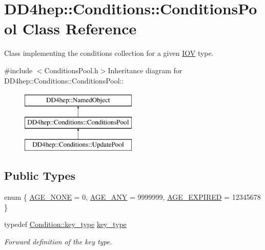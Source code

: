 \hypertarget{class_d_d4hep_1_1_conditions_1_1_conditions_pool}{
\section{DD4hep::Conditions::ConditionsPool Class Reference}
\label{class_d_d4hep_1_1_conditions_1_1_conditions_pool}
}


Class implementing the conditions collection for a given \hyperlink{class_d_d4hep_1_1_i_o_v}{IOV} type.  


{\ttfamily \#include $<$ConditionsPool.h$>$}Inheritance diagram for DD4hep::Conditions::ConditionsPool::\begin{figure}[H]
\begin{center}
\leavevmode
\includegraphics[height=3cm]{class_d_d4hep_1_1_conditions_1_1_conditions_pool}
\end{center}
\end{figure}
\subsection*{Public Types}
\begin{DoxyCompactItemize}
\item 
enum \{ \hyperlink{class_d_d4hep_1_1_conditions_1_1_conditions_pool_a3f11aa918cf5bb4fdc5958cfee1db0d6a2f31419779b9f1077b365a1619b33157}{AGE\_\-NONE} =  0, 
\hyperlink{class_d_d4hep_1_1_conditions_1_1_conditions_pool_a3f11aa918cf5bb4fdc5958cfee1db0d6acf4756de3366a75476e4f4cc5c5c6c2b}{AGE\_\-ANY} =  9999999, 
\hyperlink{class_d_d4hep_1_1_conditions_1_1_conditions_pool_a3f11aa918cf5bb4fdc5958cfee1db0d6a8c256302f79cdb95e87657c7afd5d3ae}{AGE\_\-EXPIRED} =  12345678
 \}
\item 
typedef \hyperlink{class_d_d4hep_1_1_conditions_1_1_condition_a7528efa762e8cc072ef80ea67c3531f9}{Condition::key\_\-type} \hyperlink{class_d_d4hep_1_1_conditions_1_1_conditions_pool_af0032de2b90b6bab00bf857f6078daaf}{key\_\-type}
\begin{DoxyCompactList}\small\item\em Forward definition of the key type. \item\end{DoxyCompactList}\end{DoxyCompactItemize}
